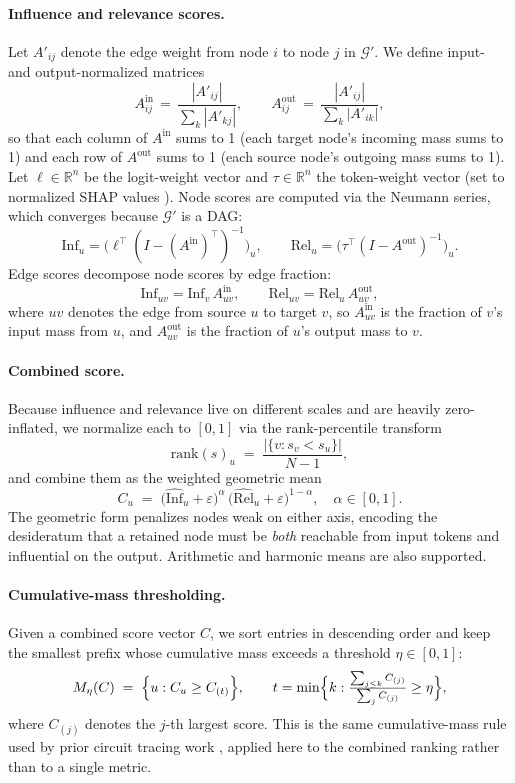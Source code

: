 \documentclass[11pt]{article}
\newcommand{\cG}{\mathcal{G}}
\newcommand{\R}{\mathbb{R}}
\begin{document}
\paragraph{Influence and relevance scores.}
Let $A'_{ij}$ denote the edge weight from node $i$ to node $j$ in $\cG'$. We define input- and output-normalized matrices
\[
A^{\mathrm{in}}_{ij} \,=\, \frac{|A'_{ij}|}{\sum_{k}|A'_{kj}|}, \qquad
A^{\mathrm{out}}_{ij} \,=\, \frac{|A'_{ij}|}{\sum_{k}|A'_{ik}|},
\]
so that each column of $A^{\mathrm{in}}$ sums to 1 (each target node's incoming mass sums to 1) and each row of $A^{\mathrm{out}}$ sums to 1 (each source node's outgoing mass sums to 1). Let $\ell\in\R^n$ be the logit-weight vector and $\tau\in\R^n$ the token-weight vector (set to normalized SHAP values \cite{shap}). Node scores are computed via the Neumann series, which converges because $\cG'$ is a DAG:
\[
\mathrm{Inf}_u = \bigl(\ell^\top (I-(A^{\mathrm{in}})^{\top})^{-1}\bigr)_u, \qquad
\mathrm{Rel}_u = \bigl(\tau^\top (I-A^{\mathrm{out}})^{-1}\bigr)_u.
\]
Edge scores decompose node scores by edge fraction:
\[
\mathrm{Inf}_{uv} = \mathrm{Inf}_v\,A^{\mathrm{in}}_{uv}, \qquad
\mathrm{Rel}_{uv} = \mathrm{Rel}_u\,A^{\mathrm{out}}_{uv},
\]
where $uv$ denotes the edge from source $u$ to target $v$, so $A^{\mathrm{in}}_{uv}$ is the fraction of $v$'s input mass from $u$, and $A^{\mathrm{out}}_{uv}$ is the fraction of $u$'s output mass to $v$.

\paragraph{Combined score.}
Because influence and relevance live on different scales and are heavily zero-inflated, we normalize each to $[0,1]$ via the rank-percentile transform
\[
\mathrm{rank}(s)_u \;=\; \frac{|\{v : s_v < s_u\}|}{N - 1},
\]
and combine them as the weighted geometric mean
\[
C_u \;=\; \bigl(\widehat{\mathrm{Inf}}_u + \varepsilon\bigr)^{\alpha}\,\bigl(\widehat{\mathrm{Rel}}_u + \varepsilon\bigr)^{1-\alpha}, \quad \alpha\in[0,1].
\]
The geometric form penalizes nodes weak on either axis, encoding the desideratum that a retained node must be \emph{both} reachable from input tokens and influential on the output. Arithmetic and harmonic means are also supported.

\paragraph{Cumulative-mass thresholding.}
Given a combined score vector $C$, we sort entries in descending order and keep the smallest prefix whose cumulative mass exceeds a threshold $\eta\in[0,1]$:
\[
M_\eta(C) \;=\; \Bigl\{u : C_u \ge C_{(t)}\Bigr\}, \qquad
t = \min\Bigl\{k : \tfrac{\sum_{j\le k} C_{(j)}}{\sum_j C_{(j)}} \ge \eta\Bigr\},
\]
where $C_{(j)}$ denotes the $j$-th largest score. This is the same cumulative-mass rule used by prior circuit tracing work \cite{circuit-tracer}, applied here to the combined ranking rather than to a single metric.
\end{document}
